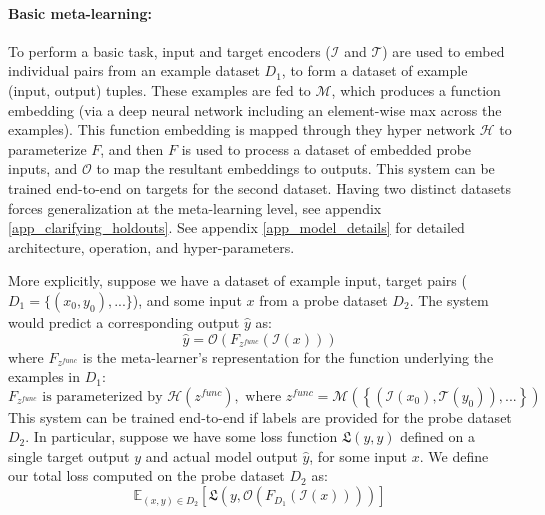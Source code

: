 \documentclass{article}
\begin{document}
\paragraph{Basic meta-learning:} To perform a basic task, input and target encoders ($\mathcal{I}$ and $\mathcal{T}$) are used to embed individual pairs from an example dataset \(D_1\), to form a dataset of example (input, output) tuples. These examples are fed to $\mathcal{M}$, which produces a function embedding (via a deep neural network including an element-wise max across the examples). This function embedding is mapped through they hyper network $\mathcal{H}$ to parameterize $F$, and then $F$ is used to process a dataset of embedded probe inputs, and $\mathcal{O}$ to map the resultant embeddings to outputs. This system can be trained end-to-end on targets for the second dataset. Having two distinct datasets forces generalization at the meta-learning level, see appendix \ref{app_clarifying_holdouts}. See appendix \ref{app_model_details} for detailed architecture, operation, and hyper-parameters. \par 
More explicitly, suppose we have a dataset of example input, target pairs ($D_1 = \{(x_0, y_0), ...\}$), and some input $x$ from a probe dataset $D_2$. The system would predict a corresponding output $\hat{y}$ as: 
\[\hat{y} = \mathcal{O}\left(F_{z^{func}}\left(\mathcal{I} \left(x\right)\right) \right)\]
where $F_{z^{func}}$ is the meta-learner's representation for the function underlying the examples in $D_1$:
\[F_{z^{func}} \text{ is parameterized by } \mathcal{H}\left(z^{func}\right), \text{ where } z^{func} = \mathcal{M}\left( \left\{\left(\mathcal{I}\left(x_0\right), \mathcal{T}\left(y_0\right) \right), ... \right\}\right)\]
This system can be trained end-to-end if labels are provided for the probe dataset $D_2$. In particular, suppose we have some loss function $\mathfrak{L}(y, \hat{y})$ defined on a single target output $y$ and actual model output $\hat{y}$, for some input $x$. We define our total loss computed on the probe dataset $D_2$ as:
\[\mathbb{E}_{(x, y)\in {D}_2} \left[ \mathfrak{L}\left(y, \mathcal{O}\left(F_{D_1}\left(\mathcal{I} \left(x\right)\right) \right)\right)\right]\]
\end{document}
